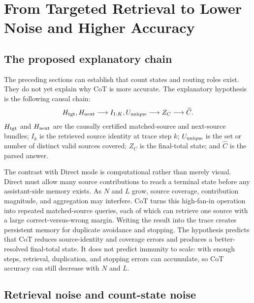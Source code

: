 \section{From Targeted Retrieval to Lower Noise and Higher Accuracy}
\label{sec:synthesis}

\subsection{The proposed explanatory chain}

The preceding sections can establish that count states and routing roles exist. They do not yet explain why CoT is more accurate. The explanatory hypothesis is the following causal chain:
\begin{equation}
H_{\rm tgt},H_{\rm next}
\longrightarrow
I_{1:K},U_{\rm unique}
\longrightarrow
Z_C
\longrightarrow
\widehat C.
\label{eq:mediation-chain}
\end{equation}
\(H_{\rm tgt}\) and \(H_{\rm next}\) are the causally certified matched-source and next-source bundles; \(I_k\) is the retrieved source identity at trace step \(k\); \(U_{\rm unique}\) is the set or number of distinct valid sources covered; \(Z_C\) is the final-total state; and \(\widehat C\) is the parsed answer.

The contrast with Direct mode is computational rather than merely visual. Direct must allow many source contributions to reach a terminal state before any assistant-side memory exists. As \(N\) and \(L\) grow, source coverage, contribution magnitude, and aggregation may interfere. CoT turns this high-fan-in operation into repeated matched-source queries, each of which can retrieve one source with a large correct-versus-wrong margin. Writing the result into the trace creates persistent memory for duplicate avoidance and stopping. The hypothesis predicts that CoT reduces source-identity and coverage errors and produces a better-resolved final-total state. It does not predict immunity to scale: with enough steps, retrieval, duplication, and stopping errors can accumulate, so CoT accuracy can still decrease with \(N\) and \(L\).

\subsection{Retrieval noise and count-state noise}

